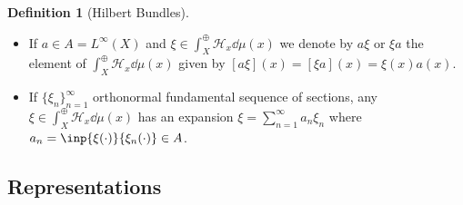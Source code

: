 \documentclass[12pt]{article}
\renewcommand{\H}{\mathcal{H}}
\theoremstyle{definition}
\newtheorem{definition}{Definition}[]
\theoremstyle{plain}
\theoremstyle{remark}
\begin{document}
\begin{definition}[Hilbert Bundles]
\begin{itemize}
\[            \]
        is a Hilbert space with inner product $ \inp{\xi}{\eta} = \int_{X}\inp{\xi(x)}{\eta(x)}\dd{\mu(x)} $.
        \item If $ a\in A = L^{\infty}(X) $ and $ \xi\in\int_{X}^{\oplus}\H_{x}\dd{\mu(x)} $ we denote by $ a \xi $ or $ \xi a $ the element of $ \int_{X}^{\oplus}\H_{x}\dd{\mu(x)} $ given by $ [a \xi](x) = [\xi a](x) = \xi(x)a(x) $.
        \item If $ \{\xi_{n}\}_{n=1}^{\infty} $ orthonormal fundamental sequence of sections, any $ \xi\in\int_{X}^{\oplus}\H_{x}\dd{\mu(x)} $ has an expansion $ \xi = \sum_{n=1}^{\infty}a_{n} \xi_{n} $ where $ a_{n} = \inp{\xi(\cdot)}{\xi_{n}(\cdot)}\in A $.
    \end{itemize}
\end{definition}

\subsection{Representations}
\end{document}
